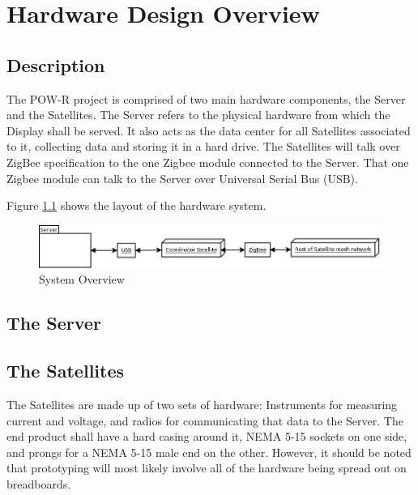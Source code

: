
\chapter{Hardware Design Overview}

\section{Description}

The POW-R project is comprised of two main hardware components, the Server and the Satellites. 
The Server refers to the physical hardware from which the Display shall be served. 
It also acts as the data center for all Satellites associated to it, collecting data and storing it in a hard drive. 
The Satellites will talk over ZigBee specification to the one Zigbee module connected to the Server. 
That one Zigbee module can talk to the Server over Universal Serial Bus (USB).
 
Figure \ref{SystemOverview} shows the layout of the hardware system.

\begin{figure}[H]
\centering
\includegraphics[scale=0.3]{Hardware/images/SystemOverview.png}
\caption{System Overview}
\label{SystemOverview}
\end{figure}

\section{The Server}





\section{The Satellites}
The Satellites are made up of two sets of hardware: 
Instruments for measuring current and voltage, and radios for communicating that data to the Server. 
The end product shall have a hard casing around it, NEMA 5-15 sockets on one side, and prongs for a NEMA 5-15 male end on the other. 
However, it should be noted that prototyping will most likely involve all of the hardware being spread out on breadboards.



